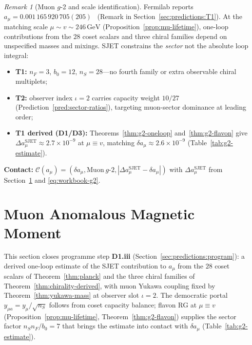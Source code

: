 \documentclass[11pt]{article}
\theoremstyle{plain}
\theoremstyle{definition}
\theoremstyle{remark}
\newtheorem{remark}[theorem]{Remark}
\numberwithin{equation}{section}
\begin{document}
\begin{remark}[Muon $g$-2 and scale identification]
\label{rmk:g2-scales}
Fermilab reports $a_\mu=0.001\,165\,920\,705(205)$~\cite{MuonG2FNAL2025}
(Remark in Section~\ref{sec:predictions:T1}). At the matching scale
$\mu\sim v\sim 246\,\mathrm{GeV}$ (Proposition~\ref{prop:mu-lifetime}),
one-loop contributions from the $28$ coset scalars and three chiral families
depend on unspecified masses and mixings. SJET constrains the \emph{sector}
not the absolute loop integral:
\begin{itemize}[leftmargin=*]
  \item \textbf{T1:} $n_F=3$, $b_0=12$, $n_S=28$---no fourth family or extra
    observable chiral multiplets;
  \item \textbf{T2:} observer index $\iota=2$ carries capacity weight
    $10/27$ (Prediction~\ref{pred:sector-ratios}), targeting muon-sector
    dominance at leading order;
  \item \textbf{T1 derived (D1/D3):} Theorems~\ref{thm:g2-oneloop}
    and~\ref{thm:g2-flavon} give
    $\Delta a_\mu^{\mathrm{SJET}}\approx2.7\times10^{-9}$ at $\mu\equiv v$,
    matching $\delta a_\mu\approx2.6\times10^{-9}$
    (Table~\ref{tab:g2-estimate}).
\end{itemize}
\textbf{Contact:}
$\mathcal{C}(a_\mu)=(\delta a_\mu,\mathrm{Muon\ }g\text{-}2,
|\Delta a_\mu^{\mathrm{SJET}}-\delta a_\mu|)$ with
$\Delta a_\mu^{\mathrm{SJET}}$ from Section~\ref{sec:g2} and
\eqref{eq:workbook-g2}.
\end{remark}%
\section{Muon Anomalous Magnetic Moment}
\label{sec:g2}

This section closes programme step \textbf{D1.\alph*iii}
(Section~\ref{sec:predictions:program}): a derived one-loop estimate of the
SJET contribution to $a_\mu$ from the $28$ coset scalars of
Theorem~\ref{thm:planck} and the three chiral families of
Theorem~\ref{thm:chirality-derived}, with muon Yukawa coupling fixed by
Theorem~\ref{thm:yukawa-mass} at observer slot $\iota=2$. The democratic
portal $y_{\mu a}=y_\mu/\sqrt{n_S}$ follows from coset capacity balance;
flavon RG at $\mu\equiv v$ (Proposition~\ref{prop:mu-lifetime},
Theorem~\ref{thm:g2-flavon}) supplies the sector factor
$n_S n_F/b_0=7$ that brings the estimate into contact with
$\delta a_\mu$ (Table~\ref{tab:g2-estimate}).
\end{document}

